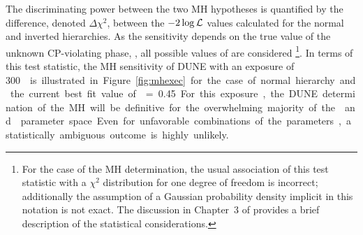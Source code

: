 The discriminating power between the two MH hypotheses is quantified
by the difference, denoted $\Delta \chi^2$, between the
$-2\log{\cal L}$ values calculated for the normal and inverted
hierarchies. As the sensitivity depends on the true value of the unknown
CP-violating phase, \deltacp, all possible values of \deltacp are
considered  \footnote{For the case of the MH determination, the usual
  association of this test statistic with a $\chi^2$ distribution for
  one degree of freedom is incorrect; additionally the assumption of a
  Gaussian probability density %
  implicit in this notation is not exact.  The discussion in Chapter~3
  of \volphys provides a brief description of the statistical
  considerations.}.  In terms of this test statistic, the MH
sensitivity of DUNE with an exposure of \SI{300}\ktMWyr{} is
illustrated in Figure~\ref{fig:mhexec} for the case of normal
hierarchy and the current best fit value of  = \SI{0.45}. 
For this exposure, the DUNE determination of the MH will be definitive for
the overwhelming majority of the  \deltacp and  parameter space.
Even for unfavorable combinations of the parameters, a statistically
ambiguous outcome is highly unlikely.  
